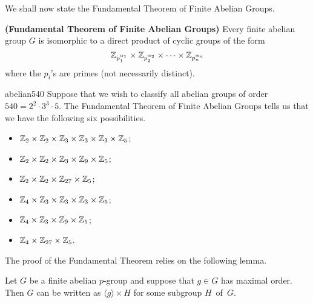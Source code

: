  
\medskip

We shall now state the Fundamental Theorem of Finite Abelian Groups. 
 
 
\begin{theorem}
{\bf (Fundamental Theorem of Finite Abelian
Groups)} 
Every finite abelian group $G$ is isomorphic to a direct product of
cyclic groups of the form 
\[
{\Bbb Z}_{p_1^{ \alpha_1 }}
\times
{\Bbb Z}_{p_2^{ \alpha_2 }}
\times
\cdots
\times
{\Bbb Z}_{p_n^{ \alpha_n }}
\]
where the $p_i$'s are primes (not necessarily distinct).
\end{theorem}
 
 
\begin{example}{abelian540}
Suppose that we wish to classify all abelian groups of order $540=2^2
\cdot 3^3 \cdot 5$.  The Fundamental Theorem of Finite Abelian Groups 
tells us that we have the following six possibilities.
\begin{itemize}
 
\item
${\Bbb Z}_2 \times {\Bbb Z}_2 \times {\Bbb Z}_3
\times {\Bbb Z}_3 \times {\Bbb Z}_3 \times {\Bbb Z}_5$;
 
\item
${\Bbb Z}_2 \times {\Bbb Z}_2 \times {\Bbb Z}_3
\times {\Bbb Z}_9 \times {\Bbb Z}_5$;
 
 
\item
${\Bbb Z}_2 \times {\Bbb Z}_2
\times {\Bbb Z}_{27} \times {\Bbb Z}_5$;
 
 
\item
${\Bbb Z}_4 \times {\Bbb Z}_3
\times {\Bbb Z}_3 \times {\Bbb Z}_3 \times {\Bbb Z}_5$;
 
\item
${\Bbb Z}_4 \times {\Bbb Z}_3
\times {\Bbb Z}_9 \times {\Bbb Z}_5$;
 
\item
${\Bbb Z}_4 \times {\Bbb Z}_{27} \times {\Bbb Z}_5$.
 
\end{itemize}
\end{example}
 

 
 
The  proof of the Fundamental Theorem relies on the following lemma.
 
 
 
\begin{lemma}
Let $G$ be a finite abelian $p$-group and suppose that $g \in G$ has
maximal order. Then $G$ can be written as $\langle g \rangle \times H$
for some subgroup $H$~of~$G$. 
\end{lemma}
 
